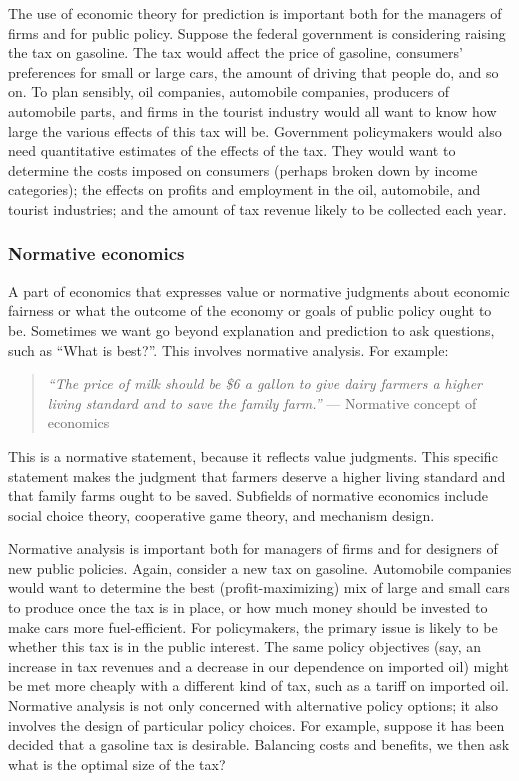 \documentclass[11pt,]{book}
\theoremstyle{definition}
\theoremstyle{definition}
\theoremstyle{definition}
\theoremstyle{remark}
\begin{document}
The use of economic theory for prediction is important both for the
managers of firms and for public policy. Suppose the federal government
is considering raising the tax on gasoline. The tax would affect the
price of gasoline, consumers' preferences for small or large cars, the
amount of driving that people do, and so on. To plan sensibly, oil
companies, automobile companies, producers of automobile parts, and
firms in the tourist industry would all want to know how large the
various effects of this tax will be. Government policymakers would also
need quantitative estimates of the effects of the tax. They would want
to determine the costs imposed on consumers (perhaps broken down by
income categories); the effects on profits and employment in the oil,
automobile, and tourist industries; and the amount of tax revenue likely
to be collected each year.

\subsubsection{Normative economics}\label{normative-economics}

A part of economics that expresses value or normative judgments about
economic fairness or what the outcome of the economy or goals of public
policy ought to be. Sometimes we want go beyond explanation and
prediction to ask questions, such as ``What is best?''. This involves
normative analysis. For example:

\begin{quote}
\emph{``The price of milk should be \$6 a gallon to give dairy farmers a
higher living standard and to save the family farm.''} --- Normative
concept of economics
\end{quote}

This is a normative statement, because it reflects value judgments. This
specific statement makes the judgment that farmers deserve a higher
living standard and that family farms ought to be saved. Subfields of
normative economics include social choice theory, cooperative game
theory, and mechanism design.

Normative analysis is important both for managers of firms and for
designers of new public policies. Again, consider a new tax on gasoline.
Automobile companies would want to determine the best
(profit-maximizing) mix of large and small cars to produce once the tax
is in place, or how much money should be invested to make cars more
fuel-efficient. For policymakers, the primary issue is likely to be
whether this tax is in the public interest. The same policy objectives
(say, an increase in tax revenues and a decrease in our dependence on
imported oil) might be met more cheaply with a different kind of tax,
such as a tariff on imported oil. Normative analysis is not only
concerned with alternative policy options; it also involves the design
of particular policy choices. For example, suppose it has been decided
that a gasoline tax is desirable. Balancing costs and benefits, we then
ask what is the optimal size of the tax?
\end{document}
